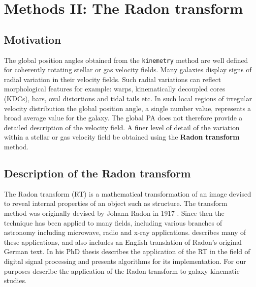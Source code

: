\section{Methods II: The Radon transform}
\label{sec:methods-II-Radon}

\subsection{Motivation}
\label{sec:motivation}
The global position angles obtained from the \texttt{kinemetry} method are well defined for coherently rotating stellar or gas velocity fields. Many galaxies display signs of radial variation in their velocity fields. Such radial variations can reflect morphological features for example: warps, kinematically decoupled cores (KDCs), bars, oval distortions and tidal tails etc. In such local regions of irregular velocity distribution the global position angle, a single number value, represents a broad average value for the galaxy. The global PA does not therefore provide a detailed description of the velocity field. A finer level of detail of the variation within a stellar or gas velocity field be obtained using the \textbf{Radon transform} method.

\subsection{Description of the Radon transform}

The Radon transform (RT) is a mathematical transformation of an image devised to reveal internal properties of an object such as structure. The transform method was originally devised by Johann Radon in 1917 \citep{radon1917determination}. Since then the technique has been applied to many fields, including various branches of astronomy including microwave, radio and x-ray applications. \citet{deans2007radon} describes many of these applications, and also includes an English translation of Radon's original German text. In his PhD thesis \citet{7910dc8d5b654c90ac4bc94c67d06f01} describes the application of the RT in the field of digital signal processing and presents algorithms for its implementation. For our purposes \cite{2018MNRAS.480.2217S} describe the application of the Radon transform to galaxy kinematic studies.  

